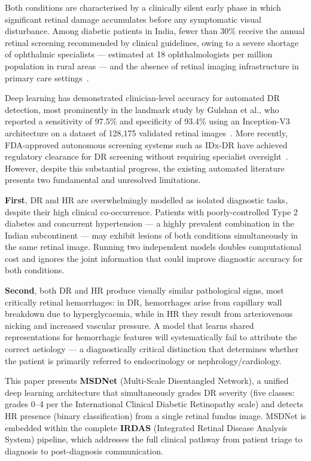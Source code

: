 \documentclass[review,12pt]{elsarticle}
\begin{document}
Both conditions are characterised by a clinically silent early phase in which
significant retinal damage accumulates before any symptomatic visual
disturbance. Among diabetic patients in India, fewer than 30\% receive the
annual retinal screening recommended by clinical guidelines, owing to a severe
shortage of ophthalmic specialists — estimated at 18 ophthalmologists per
million population in rural areas — and the absence of retinal imaging
infrastructure in primary care
settings~\cite{raman2019,npcb2022}.

Deep learning has demonstrated clinician-level accuracy for automated DR
detection, most prominently in the landmark study by Gulshan et al., who
reported a sensitivity of 97.5\% and specificity of 93.4\% using an
Inception-V3 architecture on a dataset of 128,175 validated retinal
images~\cite{gulshan2016}. More recently, FDA-approved autonomous screening
systems such as IDx-DR have achieved regulatory clearance for DR screening
without requiring specialist oversight~\cite{abramoff2018}. However, despite
this substantial progress, the existing automated literature presents two
fundamental and unresolved limitations.

\textbf{First}, DR and HR are overwhelmingly modelled as isolated diagnostic
tasks, despite their high clinical co-occurrence. Patients with
poorly-controlled Type 2 diabetes and concurrent hypertension — a highly
prevalent combination in the Indian subcontinent — may exhibit lesions of both
conditions simultaneously in the same retinal image. Running two independent
models doubles computational cost and ignores the joint information that
could improve diagnostic accuracy for both conditions.

\textbf{Second}, both DR and HR produce visually similar pathological signs,
most critically retinal hemorrhages: in DR, hemorrhages arise from capillary
wall breakdown due to hyperglycaemia, while in HR they result from
arteriovenous nicking and increased vascular pressure. A model that learns
shared representations for hemorrhagic features will systematically fail to
attribute the correct aetiology — a diagnostically critical distinction that
determines whether the patient is primarily referred to endocrinology or
nephrology/cardiology.

This paper presents \textbf{MSDNet} (Multi-Scale Disentangled Network), a
unified deep learning architecture that simultaneously grades DR severity
(five classes: grades 0--4 per the International Clinical Diabetic Retinopathy
scale) and detects HR presence (binary classification) from a single retinal
fundus image. MSDNet is embedded within the complete \textbf{IRDAS} (Integrated
Retinal Disease Analysis System) pipeline, which addresses the full clinical
pathway from patient triage to diagnosis to post-diagnosis communication.
\end{document}

